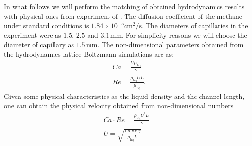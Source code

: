 \documentclass{article}
\begin{document}
In what follows we will perform the matching of obtained hydrodynamics results
\cite{kuzmin-binary2d} with physical ones from experiment of \citet{bercic-mass}. The diffusion
coefficient of the methane under standard conditions \cite{methane-properties} is
$1.84\times 10^{-5} \mathrm{cm}^2/\mathrm{s}$. The diameters of capillaries in the experiment were
as $1.5$, $2.5$ and
$3.1\,\mathrm{mm}$. For simplicity reasons we will choose the diameter of capillary as $1.5\,
\mathrm{mm}$. 
The non-dimensional parameters obtained from the hydrodynamics lattice Boltzmann simulations are
as:
\begin{equation}
\begin{aligned}
&Ca=\frac{U \mu_{\mathrm{liq}}}{\gamma}\\
&Re=\frac{\rho_{\mathrm{liq}} U L}{\mu_{\mathrm{liq}}}.
\end{aligned}
\end{equation}
Given some physical characteristics as the liquid density and the channel length,
one can obtain the physical velocity obtained from non-dimensional numbers:
\begin{equation}
\begin{aligned}
Ca\cdot Re= \frac{\rho_{\mathrm{liq}} U^2 L}{\gamma}\\
U=\sqrt{\frac{Ca\,Re\,\gamma}{\rho_{\mathrm{liq}}L}}
\end{aligned}
\end{equation}
\end{document}
